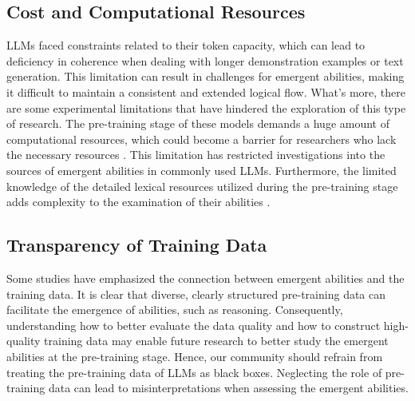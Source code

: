 \documentclass[11pt,a4paper]{article}
\begin{document}
\subsection{Cost and Computational Resources}
LLMs faced constraints related to their token capacity, which can lead to deficiency in coherence when dealing with longer demonstration examples or text generation. This limitation can result in challenges for emergent abilities, making it difficult to maintain a consistent and extended logical flow.
What's more, there are some experimental limitations that have hindered the exploration of this type of research. The pre-training stage of these models demands a huge amount of computational resources, which could become a barrier for researchers who lack the necessary resources \citep{Shin2022OnTE, Brown2020LanguageMA, Wei2022EmergentAO, Berglund2023TheRC}. This limitation has restricted investigations into the sources of emergent abilities in commonly used LLMs. Furthermore, the limited knowledge of the detailed lexical resources utilized during the pre-training stage adds complexity to the examination of their abilities \citep{Berglund2023TheRC}.
\vspace{-1mm}
\subsection{Transparency of Training Data}
Some studies \cite{Chan2022DataDP, Razeghi2022ImpactOP, Shin2022OnTE, Power2022GrokkingGB} have emphasized the connection between emergent abilities and the training data. 
It is clear that diverse, clearly structured pre-training data can facilitate the emergence of abilities, such as reasoning. Consequently, understanding how to better evaluate the data quality and how to construct high-quality training data may enable future research to better study the emergent abilities at the pre-training stage.
Hence, our community should refrain from treating the pre-training data of LLMs as black boxes.
Neglecting the role of pre-training data can lead to misinterpretations when assessing the emergent abilities.
\end{document}
